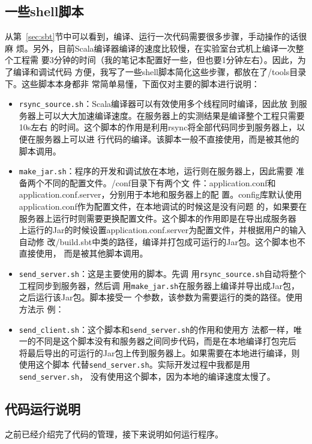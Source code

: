 \documentclass{article}
\begin{document}
\subsection{一些shell脚本}
从第~\ref{sec:sbt}节中可以看到，编译、运行一次代码需要很多步骤，手动操作的话很麻
烦。另外，目前Scala编译器编译的速度比较慢，在实验室台式机上编译一次整个工程需
要3分钟的时间（我的笔记本配置好一些，但也要1分钟左右）。因此，为了编译和调试代码
方便，我写了一些shell脚本简化这些步骤，都放在了\prj/tools目录下。这些脚本本身都非
常简单易懂，下面仅对主要的脚本进行说明：
\begin{itemize}
\item \texttt{rsync\_source.sh}：Scala编译器可以有效使用多个线程同时编译，因此放
  到服务器上可以大大加速编译速度。在服务器上的实测结果是编译整个工程只需要10s左右
  的时间。这个脚本的作用是利用rsync将全部代码同步到服务器上，以便在服务器上可以进
  行代码的编译。该脚本一般不直接使用，而是被其他的脚本调用。
\item \texttt{make\_jar.sh}：程序的开发和调试放在本地，运行则在服务器上，因此需要
  准备两个不同的配置文件。\prj/conf目录下有两个文
  件：application.conf和application.conf.server，分别用于本地和服务器上的配
  置。config库默认使用application.conf作为配置文件，在本地调试的时候这是没有问题
  的，如果要在服务器上运行时则需要更换配置文件。这个脚本的作用即是在导出成服务器
  上运行的Jar的时候设置application.conf.server为配置文件，并根据用户的输入自动修
  改\prj/build.sbt中类的路径，编译并打包成可运行的Jar包。这个脚本也不直接使用，
  而是被其他脚本调用。
\item \texttt{send\_server.sh}：这是主要使用的脚本。先调
  用\texttt{rsync\_source.sh}自动将整个工程同步到服务器，然后调
  用\texttt{make\_jar.sh}在服务器上编译并导出成Jar包，之后运行该Jar包。脚本接受一
  个参数，该参数为需要运行的类的路径。使用方法示
  例：\\
\item \texttt{send\_client.sh}：这个脚本和\texttt{send\_server.sh}的作用和使用方
  法都一样，唯一的不同是这个脚本没有和服务器之间同步代码，而是在本地编译打包完后
  将最后导出的可运行的Jar包上传到服务器上。如果需要在本地进行编译，则使用这个脚本
  代替\texttt{send\_server.sh}。实际开发过程中我都是用\texttt{send\_server.sh}，
  没有使用这个脚本，因为本地的编译速度太慢了。
\end{itemize}

\subsection{代码运行说明}
\label{sec:code}
之前已经介绍完了代码的管理，接下来说明如何运行程序。
\end{document}
